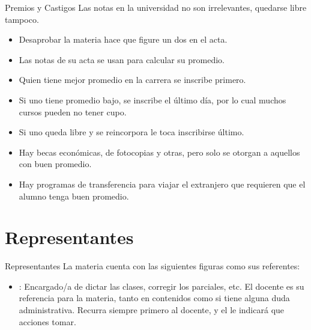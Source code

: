 \begin{frame}{Premios y Castigos}
  Las notas en la universidad no son irrelevantes, quedarse libre tampoco.
  \begin{itemize}
    \item Desaprobar la materia hace que figure un dos en el acta.
    \item Las notas de su acta se usan para calcular su promedio.
    \item Quien tiene mejor promedio en la carrera se inscribe primero.
    \item Si uno tiene promedio bajo, se inscribe el último día, por lo cual
      muchos cursos pueden no tener cupo.
    \item Si uno queda libre y se reincorpora le toca inscribirse último.
    \item Hay becas económicas, de fotocopias y otras, pero solo se otorgan a
      aquellos con buen promedio.
    \item Hay programas de transferencia para viajar el extranjero que requieren
      que el alumno tenga buen promedio.
  \end{itemize}
\end{frame}


\section{Representantes}


\begin{frame}{Representantes}
  La materia cuenta con las siguientes figuras como sus referentes:
  \begin{itemize}
    \item {}: Encargado/a de dictar las clases, corregir los
      parciales, etc.
      \jump
      El docente es su referencia para la materia, tanto en contenidos como si
      tiene alguna duda administrativa.
      \jump
      Recurra siempre primero al docente, y el le indicará que acciones tomar.
  \end{itemize}
\end{frame}

